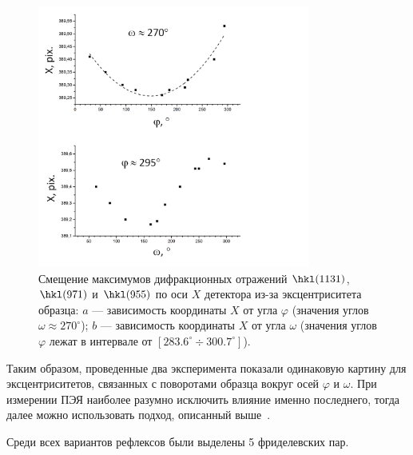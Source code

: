 \documentclass[a4paper,14pt]{extarticle}
\newcommand{\degree}{^\circ}
\newcommand{\range}[2]{[#1\div#2]}
\begin{document}
\begin{figure}[ht!]
    \centering
    \includegraphics[width=0.8\textwidth]{eccentrSi.png}
    \caption{Смещение максимумов дифракционных отражений $\hkl(11 3 1)$, $\hkl(9 7 1)$ и $\hkl(9 5 5)$ по оси $X$ детектора из-за эксцентриситета образца: $a$ --– зависимость координаты $X$ от угла $\varphi$ (значения углов $\omega \approx 270\degree$); $b$ --- зависимость координаты $X$ от угла $\omega$ (значения углов $\varphi$ лежат в интервале от $\range{283.6\degree}{300.7\degree}$).}
    \label{fig:eccentrSi}
\end{figure}

Таким образом, проведенные два эксперимента показали одинаковую картину для эксцентриситетов, связанных с поворотами образца вокруг осей $\varphi$ и $\omega$.
При измерении ПЭЯ наиболее разумно исключить влияние именно последнего, тогда далее можно использовать подход, описанный выше~\cite{Ponomarev:1969}.

Среди всех вариантов рефлексов были выделены 5 фриделевских пар.
\end{document}
